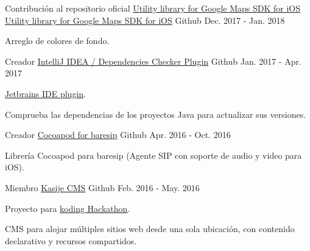 \begin{cventries}
  \cventry
    {Contribución al repositorio oficial \href{https://github.com/googlemaps/google-maps-ios-utils}{Utility library for Google Maps SDK for iOS}} %
    {\faMapMarker \hphantom{-} \href{https://github.com/zp1ke/google-maps-ios-utils}{Utility library for Google Maps SDK for iOS}} %
    {\faGithubSquare\acvHeaderIconSep Github} %
    {Dec. 2017 - Jan. 2018} %
    {
      \begin{cvitems} %
        \item {Arreglo de colores de fondo.}
      \end{cvitems}
    }

  \cventry
    {Creador} %
    {\href{https://github.com/zp1ke/deps-checker}{IntelliJ IDEA / Dependencies Checker Plugin}} %
    {\faGithubSquare\acvHeaderIconSep Github} %
    {Jan. 2017 - Apr. 2017} %
    {
      \begin{cvitems} %
        \item {\href{https://plugins.jetbrains.com/plugin/9481-java-dependencies-checker}{Jetbrains IDE plugin}.}
        \item {Comprueba las dependencias de los proyectos Java para actualizar sus versiones.}
      \end{cvitems}
    }

  \cventry
    {Creador} %
    {\faMobile \hphantom{-} \href{https://github.com/zp1ke/taresip}{Cocoapod for baresip}} %
    {\faGithubSquare\acvHeaderIconSep Github} %
    {Apr. 2016 - Oct. 2016} %
    {
      \begin{cvitems} %
        \item {Librería Cocoapod para baresip (Agente SIP con soporte de audio y video para iOS).}
      \end{cvitems}
    }

  \cventry
    {Miembro} %
    {\href{https://github.com/touwolf/kasije}{Kasije CMS}} %
    {\faGithubSquare\acvHeaderIconSep Github} %
    {Feb. 2016 - May. 2016} %
    {
      \begin{cvitems} %
        \item {Proyecto para \href{https://www.koding.com/Hackathon}{koding Hackathon}.}
        \item {CMS para alojar múltiples sitios web desde una sola ubicación, con contenido declarativo y recursos compartidos.}
      \end{cvitems}
    }


\end{cventries}

